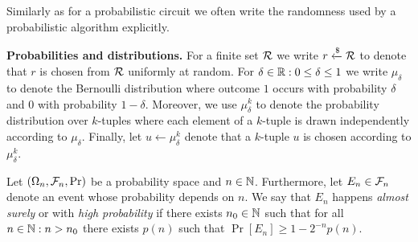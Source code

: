 Similarly as for a probabilistic circuit we often write the randomness used by a probabilistic algorithm explicitly.


\textbf{Probabilities and distributions.}
For a finite set $\mathcal{R}$ we write $r \xleftarrow{\$} \mathcal{R}$ to denote that $r$ is chosen from $\mathcal{R}$ uniformly at random.
For $\delta \in \mathbb{R} : 0 \leq \delta \leq 1$ we write $\mu_{\delta}$ to denote the Bernoulli distribution where outcome $1$ occurs with
probability $\delta$ and $0$ with probability $1-\delta$.
Moreover, we use $\mu_{\delta}^k$ to denote the probability distribution over $k$-tuples
where each element of a $k$-tuple is drawn independently according to $\mu_{\delta}$.
Finally, let $u \leftarrow \mu_{\delta}^k$ denote that a $k$-tuple $u$ is chosen according to $\mu_{\delta}^k$.


Let $(\Omega_n, \mathcal{F}_n, \Pr)$ be a probability space and $n \in \mathbb{N}$.
Furthermore, let $E_n \in \mathcal{F}_n$ denote an event whose probability depends on $n$.
We say that $E_n$ happens \textit{almost surely} or with \textit{high probability} if
there exists $n_0 \in \mathbb{N}$ such that for all $n \in \mathbb{N} : n > n_0$ there exists $p(n)$ such that $\Pr[E_n] \geq 1 - 2^{-n} \mathit{p}(n)$.

